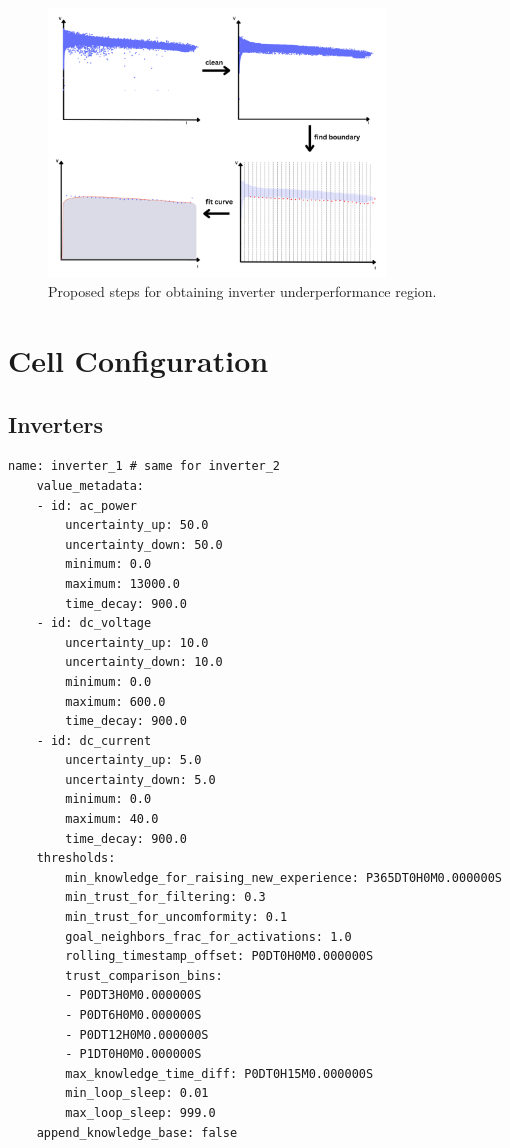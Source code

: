\begin{figure}[h!]
    \centering
    \includegraphics[width=0.8\textwidth]{figures/chapter5/algorithm/plugin_steps.pdf}
    \caption{Proposed steps for obtaining inverter underperformance region.}
    \label{fig:pluginsteps}
\end{figure}

\FloatBarrier

\section{Cell Configuration}  \label{ap2:cellconfig}


\subsection{Inverters}

\begin{lstlisting}[style=yaml]
    name: inverter_1 # same for inverter_2
    value_metadata:
    - id: ac_power
        uncertainty_up: 50.0
        uncertainty_down: 50.0
        minimum: 0.0
        maximum: 13000.0
        time_decay: 900.0
    - id: dc_voltage
        uncertainty_up: 10.0
        uncertainty_down: 10.0
        minimum: 0.0
        maximum: 600.0
        time_decay: 900.0
    - id: dc_current
        uncertainty_up: 5.0
        uncertainty_down: 5.0
        minimum: 0.0
        maximum: 40.0
        time_decay: 900.0
    thresholds:
        min_knowledge_for_raising_new_experience: P365DT0H0M0.000000S
        min_trust_for_filtering: 0.3
        min_trust_for_uncomformity: 0.1
        goal_neighbors_frac_for_activations: 1.0
        rolling_timestamp_offset: P0DT0H0M0.000000S
        trust_comparison_bins:
        - P0DT3H0M0.000000S
        - P0DT6H0M0.000000S
        - P0DT12H0M0.000000S
        - P1DT0H0M0.000000S
        max_knowledge_time_diff: P0DT0H15M0.000000S
        min_loop_sleep: 0.01
        max_loop_sleep: 999.0
    append_knowledge_base: false
\end{lstlisting}

